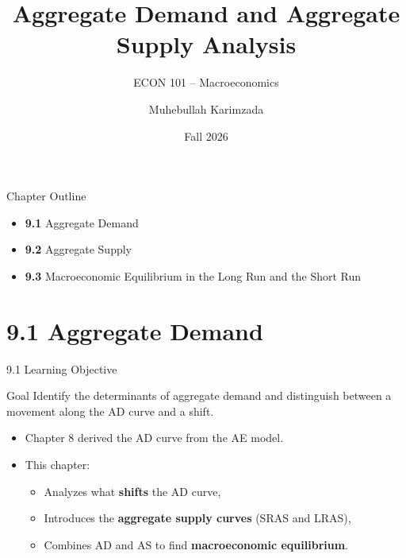 \documentclass[aspectratio=169]{beamer}
\title{\textbf{Aggregate Demand and Aggregate Supply Analysis}}
\subtitle{{\large ECON 101 -- Macroeconomics}}
\author{Muhebullah Karimzada}
\date{Fall 2026}
\begin{document}

\begin{frame}[plain]
  \titlepage
\end{frame}

\begin{frame}{Chapter Outline}
\transfade
\begin{itemize}[<+->]
  \item \textbf{9.1} Aggregate Demand
  \item \textbf{9.2} Aggregate Supply
  \item \textbf{9.3} Macroeconomic Equilibrium in the Long Run and the Short Run
\end{itemize}
\end{frame}

\section{9.1 Aggregate Demand}

\begin{frame}{9.1 Learning Objective}
\transfade
\begin{block}{Goal}
Identify the determinants of aggregate demand and distinguish between a movement along the AD curve and a shift.
\end{block}
\begin{itemize}[<+->]
  \item Chapter 8 derived the AD curve from the AE model.
  \item This chapter:
  \begin{itemize}[<+->]
    \item Analyzes what \textbf{shifts} the AD curve,
    \item Introduces the \textbf{aggregate supply curves} (SRAS and LRAS),
    \item Combines AD and AS to find \textbf{macroeconomic equilibrium}.
  \end{itemize}
\end{itemize}
\end{frame}
\end{document}
